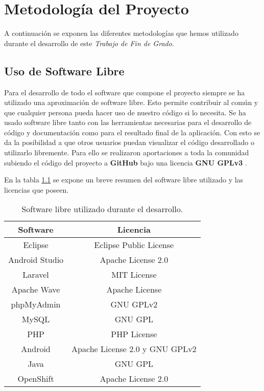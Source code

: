 \newpage
\thispagestyle{sectioned}
\chapter{Metodología del Proyecto}

A continuación se exponen las diferentes metodologías que hemos utilizado durante el desarrollo de este \textit{Trabajo de Fin de Grado}.

\section{Uso de Software Libre}

Para el desarrollo de todo el software que compone el proyecto siempre se ha utilizado una aproximación de software libre. Esto permite contribuir al común y que cualquier persona pueda hacer uso de nuestro código si lo necesita. Se ha usado software libre tanto con las herramientas necesarias para el desarrollo de código y documentación como para el resultado final de la aplicación. Con esto se da la posibilidad a que otros usuarios puedan visualizar el código desarrollado o utilizarlo libremente. Para ello se realizaron aportaciones a toda la comunidad subiendo el código del proyecto a \textbf{GitHub} bajo una licencia \textbf{GNU GPLv3} \cite{ref:GPLv3}.

En la tabla \ref{fig:tableLicenses} se expone un breve resumen del software libre utilizado y las licencias que poseen.

\begin{table}[h]
\centering
\begin{tabular}{|c|c|}
\hline
{\bf Software} & {\bf Licencia}                 \\ \hline
Eclipse        & Eclipse Public License         \\ \hline
Android Studio & Apache License 2.0             \\ \hline
Laravel        & MIT License                    \\ \hline
Apache Wave    & Apache License                 \\ \hline
phpMyAdmin     & GNU GPLv2                      \\ \hline
MySQL          & GNU GPL                        \\ \hline
PHP            & PHP License                    \\ \hline
Android        & Apache License 2.0 y GNU GPLv2 \\ \hline
Java           & GNU GPL                        \\ \hline
OpenShift      & Apache License 2.0             \\ \hline
\end{tabular}
\caption{Software libre utilizado durante el desarrollo.}
\label{fig:tableLicenses}
\end{table}

